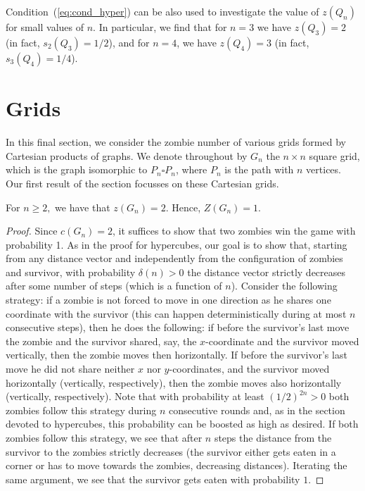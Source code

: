 \documentclass[12pt]{amsart}
\begin{document}
\medskip

Condition~(\ref{eq:cond_hyper}) can be also used to investigate the value of $z(Q_n)$ for small values of $n$. In particular, we find that for $n=3$ we have $z(Q_3)=2$ (in fact, $s_2(Q_3)=1/2$),
and for $n=4$, we have $z(Q_4)=3$ (in fact, $s_3(Q_4)=1/4$).

\section{Grids}

In this final section, we consider the zombie number of various grids formed by Cartesian products of graphs. We denote throughout by $G_n$ the $n \times n$ square grid, which is the graph isomorphic to
$P_n \square P_n$, where $P_n$ is the path with $n$ vertices. Our first result of the section focusses on these Cartesian grids.
\begin{theorem}
For $n\ge 2,$ we have that $z(G_n) =2$. Hence, $Z(G_n) =1$.
\end{theorem}
\begin{proof}
Since $c(G_n)=2$, it suffices to show that two zombies win the game with probability 1.  As in the proof for hypercubes, our goal is to show that, starting from any distance vector and independently from the
configuration of zombies and survivor, with probability $\delta(n) > 0$ the distance vector strictly decreases after some number of steps (which is a function of $n$). Consider the following strategy: if a zombie is not forced to move
in one direction as he shares one coordinate with the survivor (this can happen deterministically during at most $n$ consecutive steps), then he does the following: if before the survivor's last
move the zombie and the survivor shared, say, the $x$-coordinate and the survivor moved vertically, then the zombie moves then horizontally. If before the survivor's last move he did not share
neither $x$ nor $y$-coordinates, and the survivor moved horizontally (vertically, respectively), then the zombie moves also horizontally (vertically, respectively). Note that with probability at
least $(1/2)^{2n}
> 0$ both zombies follow this strategy during $n$ consecutive rounds and, as in the section devoted to hypercubes, this probability can be boosted as high as desired. If both zombies follow this strategy, we
see that after $n$ steps the distance from the survivor to the zombies strictly decreases (the survivor either gets eaten in a corner or has to move towards the zombies, decreasing distances).
Iterating the same argument, we see that the survivor gets eaten with probability $1$.
\end{proof}
\end{document}
